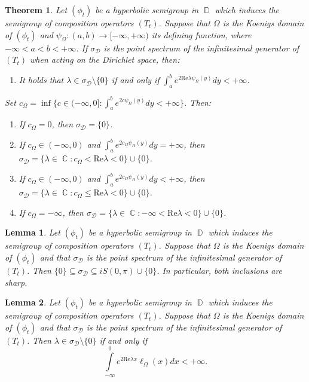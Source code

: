 \documentclass[10pt,a4paper]{amsart}
\newtheorem{theorem}{Theorem}
\newtheorem{lemma}{Lemma}
\DeclareMathOperator{\C}{\mathbb{C}}
\DeclareMathOperator{\D}{\mathbb{D}}
\begin{document}
	\begin{theorem}\label{thm:intro defining function}
		Let $(\phi_t)$ be a hyperbolic semigroup in $\D$ which induces the semigroup of composition operators $(T_t)$. Suppose that $\Omega$ is the Koenigs domain of $(\phi_t)$ and $\psi_\Omega:(a,b)\to[-\infty,+\infty)$ its defining function, where $-\infty<a<b<+\infty$. If $\sigma_\mathcal{D}$ is the point spectrum of the infinitesimal generator of $(T_t)$ when acting on the Dirichlet space, then:
		\begin{enumerate}
			\item[\textup{(a)}] It holds that $\lambda\in\sigma_\mathcal{D}\setminus\{0\}$ if and only if $\int_{a}^{b}e^{2\mathrm{Re}\lambda\psi_\Omega(y)}dy<+\infty$.
		\end{enumerate}
		Set $c_\Omega=\inf\{c\in(-\infty,0]:\int_{a}^{b}e^{2c\psi_\Omega(y)}dy<+\infty\}$. Then:
		\begin{enumerate}
			\item[\textup{(b)}]  If $c_\Omega=0$, then $\sigma_\mathcal{D}=\{0\}$.
			\item[\textup{(c)}] If $c_\Omega\in(-\infty,0)$ and $\int_{a}^{b}e^{2c_\Omega\psi_\Omega(y)}dy=+\infty$, then $\sigma_\mathcal{D}=\{\lambda\in\C:c_\Omega<\mathrm{Re}\lambda<0\}\cup\{0\}$.
			\item[\textup{(d)}] If $c_\Omega\in(-\infty,0)$ and $\int_{a}^{b}e^{2c_\Omega\psi_\Omega(y)}dy<+\infty$, then $\sigma_\mathcal{D}=\{\lambda\in\C:c_\Omega\le\mathrm{Re}\lambda<0\}\cup\{0\}$.
			\item[\textup{(e)}] If $c_\Omega=-\infty$, then $\sigma_\mathcal{D}=\{\lambda\in\C:-\infty<\mathrm{Re}\lambda<0\}\cup\{0\}$.
		\end{enumerate}
	\end{theorem}

	\begin{lemma}\label{lm:hyperbolic basic condition}
		Let $(\phi_t)$ be a hyperbolic semigroup in $\D$ which induces the semigroup of composition operators $(T_t)$. Suppose that $\Omega$ is the Koenigs domain of $(\phi_t)$ and that $\sigma_\mathcal{D}$ is the point spectrum of the infinitesimal generator of $(T_t)$. Then $\{0\}\subseteq\sigma_{\mathcal{D}}\subseteq iS(0,\pi)\cup\{0\}$. In particular, both inclusions are sharp.
	\end{lemma}

	\begin{lemma}\label{lm:hyperbolic x parametrization}
		Let $(\phi_t)$ be a hyperbolic semigroup in $\D$ which induces the semigroup of composition operators $(T_t)$. Suppose that $\Omega$ is the Koenigs domain of $(\phi_t)$ and that $\sigma_\mathcal{D}$ is the point spectrum of the infinitesimal generator of $(T_t)$. Then $\lambda\in\sigma_{\mathcal{D}}\setminus\{0\}$ if and only if
		\begin{equation}
			\int\limits_{-\infty}^{0}e^{2\mathrm{Re}\lambda x}\ell_\Omega(x)dx<+\infty.
		\end{equation}
	\end{lemma}
\end{document}
